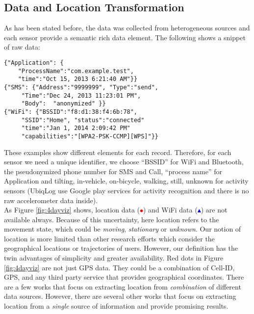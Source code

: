 \documentclass{sig-alternate}
\begin{document}
\subsection{Data and Location Transformation}
As has been stated before, the data was collected from heterogeneous sources and each sensor provide a semantic rich data element. The following shows a snippet of raw data:
\vspace{-0.1cm}
\small
\begin{verbatim}
{"Application": { 
 	"ProcessName":"com.example.test", 
 	"time":"Oct 15, 2013 6:21:40 AM"}} 
{"SMS": {"Address":"9999999", "Type":"send", 
     "Time":"Dec 24, 2013 11:23:01 PM", 
     "Body":  "anonymized" }} 
{"WiFi": {"BSSID":"f8:d1:38:f4:6b:78", 
     "SSID":"Home", "status":"connected" 
     "time":"Jan 1, 2014 2:09:42 PM" 
     "capabilities":"[WPA2-PSK-CCMP][WPS]"}}  
\end{verbatim}
\vspace{-0.1cm}
\normalsize
These examples show different elements for each record. Therefore, for each sensor we need a unique identifier, we choose ``BSSID'' for WiFi and Bluetooth, the pseudonymized phone number for SMS and Call, ``process name'' for Application and tilting, in-vehicle, on-bicycle, walking, still, unknown for activity sensors (UbiqLog use Google play services for activity recognition and there is no raw accelerometer data inside).\\
As Figure \ref{fig:4dayviz} shows, location data (\textcolor{red}{$\bullet$}) and WiFi data (\textcolor{blue}{$\blacktriangle$}) are not available always. Because of this uncertainty, here location refers to the movement state, which could be \emph{moving}, \emph{stationary} or \emph{unknown}. Our notion of location is more limited than other research efforts which consider the geographical locations or trajectories of users. However, our definition has the twin advantages of simplicity and greater availability. Red dots in Figure \ref{fig:4dayviz}  are not just GPS data. They could be a combination of Cell-ID, GPS, and any third party service that provides geographical coordinates. There are a few works \cite{gpsgsm, enefpossmart} that focus on extracting location from \emph{combination} of different data sources. However, there are several other works that focus on extracting location from a \emph{single} source of information \cite{discgps, minindqu, minprofreq, mineusermob, semloc} and provide promising results. \\
\end{document}
